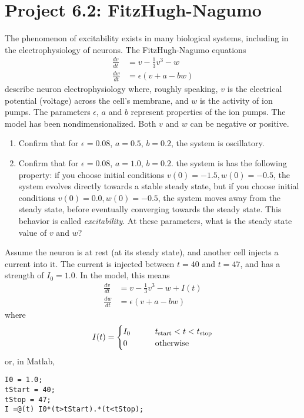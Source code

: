 \documentclass{exam}
\begin{document}
\section*{Project 6.2: FitzHugh-Nagumo}
 
 
 The phenomenon of excitability exists in many biological systems, including in the electrophysiology of neurons. The FitzHugh-Nagumo equations
 \begin{align}
 \frac{d v}{dt} &= v - \frac{1}{3} v^3 - w \\
 \frac{d w}{dt} &= \epsilon \left( v + a - bw\right)
 \end{align}
 describe neuron electrophysiology where, roughly speaking, $v$ is the electrical potential (voltage) across the cell's membrane, and $w$ is the activity of ion pumps. The parameters $\epsilon$, $a$ and $b$ represent properties of the ion pumps. The model has been nondimensionalized. Both $v$ and $w$ can be negative or positive.
 
 
\begin{enumerate}
\item Confirm that for $\epsilon=0.08$, $a=0.5$, $b=0.2$, the system is oscillatory.
\item Confirm that for $\epsilon=0.08$, $a=1.0$, $b=0.2$. the system is has the following property: if you choose initial conditions $v(0)=-1.5, w(0)=-0.5$, the system evolves directly towards a stable steady state, but if you choose initial conditions $v(0)=0.0, w(0)=-0.5$, the system moves away from the steady state, before eventually converging towards the steady state. This behavior is called \textit{excitability}. At these parameters, what is the steady state value of $v$ and $w$?
\end{enumerate}

Assume the neuron is at rest (at its steady state), and another cell injects a current into it. The current is injected between $t=40$ and $t=47$, and has a strength of $I_0=1.0$. In the model, this means 
 \begin{align}
 \frac{d v}{dt} &= v - \frac{1}{3} v^3 - w +I(t)\\
 \frac{d w}{dt} &= \epsilon \left( v + a - bw\right) 
 \end{align}
 where 
 \begin{equation}
 I(t) = \begin{cases}
 I_0 & \qquad t_{\rm start}<t < t_{\rm stop}\\
 0 & \qquad \mbox{otherwise}
 \end{cases}
 \end{equation}
or, in Matlab,
\begin{lstlisting}
I0 = 1.0;
tStart = 40;
tStop = 47;
I =@(t) I0*(t>tStart).*(t<tStop);
\end{lstlisting}
\end{document}

